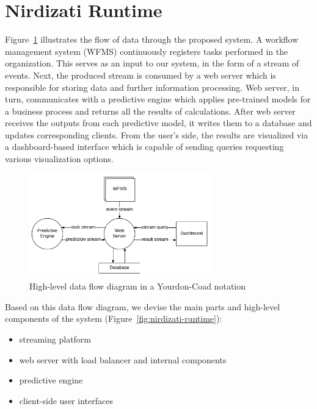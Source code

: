 \documentclass[runningheads,a4paper]{llncs}
\begin{document}
\section{Nirdizati Runtime} \label{sec:runtime}
Figure~\ref{fig:dfd_0} illustrates the flow of data through the proposed system. A workflow management system (WFMS) continuously registers tasks performed in the organization.
This serves as an input to our system, in the form of a stream of events.
Next, the produced stream is consumed by a web server which is responsible for storing data and further information processing.
Web server, in turn, communicates with a predictive engine which applies pre-trained models for a business process and returns all the results of calculations.
After web server receives the outputs from each predictive model, it writes them to a database and updates corresponding clients.
From the user's side, the results are visualized via a dashboard-based interface which is capable of sending queries requesting various visualization options.


\begin{figure}
	\centering
	\includegraphics[width=0.7\textwidth]{img/dfd_0}
	\caption{High-level data flow diagram in a Yourdon-Coad notation}
	\label{fig:dfd_0}
\end{figure}

Based on this data flow diagram, we devise the main parts and high-level components of the system (Figure~\ref{fig:nirdizati-runtime}):

\begin{itemize}
	\setlength{\itemsep}{1pt}
	\setlength{\parskip}{0pt}
	\setlength{\parsep}{0pt}
	\item streaming platform
	\item web server with load balancer and internal components
	\item predictive engine
	\item client-side user interfaces
\end{itemize}
\end{document}
